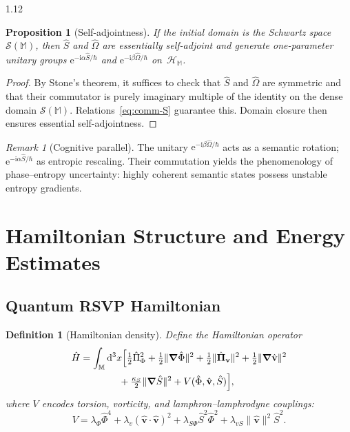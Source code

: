 \documentclass[12pt,a4paper]{article}
\numberwithin{equation}{section}
\newtheorem{definition}{Definition}[section]
\newtheorem{proposition}{Proposition}[section]
\theoremstyle{remark}
\newtheorem{remark}{Remark}[section]
\theoremstyle{definition}
\newcommand{\M}{\mathbb{M}}
\newcommand{\ii}{\mathrm{i}}
\newcommand{\ee}{\mathrm{e}}
\begin{document}
\begin{spacing}{1.12}
\begin{proposition}[Self-adjointness]
\label{prop:selfadjoint}
If the initial domain is the Schwartz space $\mathcal{S}(\M)$, then $\hat{S}$ and $\hat{\Omega}$ are essentially self-adjoint and generate one-parameter unitary groups $\ee^{-\ii\alpha \hat{S}/\hbar}$ and $\ee^{-\ii\beta \hat{\Omega}/\hbar}$ on~$\mathcal{H}_\M$.
\end{proposition}

\begin{proof}
By Stone’s theorem, it suffices to check that $\hat{S}$ and $\hat{\Omega}$ are symmetric and that their commutator is purely imaginary multiple of the identity on the dense domain $\mathcal{S}(\M)$.  Relations~\eqref{eq:comm-S} guarantee this.  Domain closure then ensures essential self-adjointness.
\end{proof}

\begin{remark}[Cognitive parallel]
The unitary $\ee^{-\ii\beta\hat{\Omega}/\hbar}$ acts as a semantic rotation; $\ee^{-\ii\alpha\hat{S}/\hbar}$ as entropic rescaling.  Their commutation yields the phenomenology of phase–entropy uncertainty: highly coherent semantic states possess unstable entropy gradients.
\end{remark}

\section{Hamiltonian Structure and Energy Estimates}
\label{sec:hamiltonian}

\subsection{Quantum RSVP Hamiltonian}
\label{subsec:hamiltonian}

\begin{definition}[Hamiltonian density]
\label{def:Hamiltonian}
Define the Hamiltonian operator
\begin{align}
\hat{H}
&=\int_{\M} \dd^3x \Big[
\tfrac{1}{2}\hat{\Pi}_\Phi^2
+\tfrac{1}{2}\|\grad\hat{\Phi}\|^2
+\tfrac{1}{2}\|\hat{\boldsymbol{\Pi}}_{\mathbf{v}}\|^2
+\tfrac{1}{2}\|\grad\hat{\mathbf{v}}\|^2 \notag\\
&\hspace{4em}
+\tfrac{\kappa_S}{2}\|\grad\hat{S}\|^2
+V(\hat{\Phi},\hat{\mathbf{v}},\hat{S})
\Big],
\label{eq:hamiltonian}
\end{align}
where $V$ encodes torsion, vorticity, and lamphron–lamphrodyne couplings:
\[
V = \lambda_\Phi \hat{\Phi}^4
+\lambda_v (\hat{\mathbf{v}}\!\cdot\!\hat{\mathbf{v}})^2
+\lambda_{S\Phi} \hat{S}^2 \hat{\Phi}^2
+\lambda_{vS} \|\hat{\mathbf{v}}\|^2\hat{S}^2.
\]
\end{definition}


\end{spacing}
\end{document}

